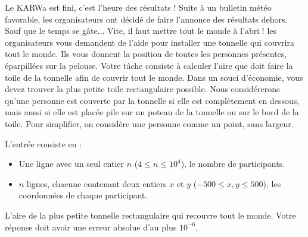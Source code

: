 \problemname{\problemyamlname}


\newcommand{\maxn}{10^4}

Le KARWa est fini, c'est l'heure des résultats ! Suite à un bulletin météo favorable, les organisateurs ont décidé de faire l'annonce des résultats dehors. Sauf que le temps se gâte... Vite, il faut mettre tout le monde à l'abri ! les organisateurs vous demandent de l'aide pour installer une tonnelle qui couvrira tout le monde.
Ils vous donnent la position de toutes les personnes présentes, éparpillées sur la pelouse. Votre tâche consiste à calculer l'aire que doit faire la toile de la tonnelle afin de couvrir tout le monde. Dans un souci d'économie, vous devez trouver la plus petite toile rectangulaire possible.
Nous considérerons qu'une personne est couverte par la tonnelle si elle est complètement en dessous, mais aussi si elle est placée pile sur un poteau de la tonnelle ou sur le bord de la toile.
Pour simplifier, on considère une personne comme un point, sans largeur.

\begin{Input}
  L'entrée consiste en :
  \begin{itemize}
    \item Une ligne avec un seul entier \(n\) (\(4 \leq n \leq \maxn\)), le nombre de participants.
    \item \(n\) lignes, chacune contenant deux entiers \(x\) et \(y\) (\(-500 \leq x, y \leq 500\)), les coordonnées de chaque participant.
  \end{itemize}
\end{Input}

\begin{Output}
  L'aire de la plus petite tonnelle rectangulaire qui recouvre tout le monde.
  Votre réponse doit avoir une erreur absolue d'au plus $10^{-6}$.
\end{Output}
